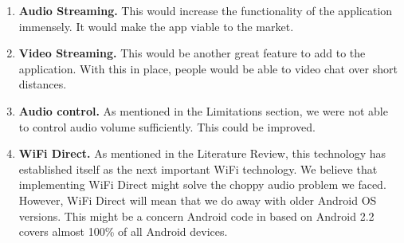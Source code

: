 \documentclass[12pt,svgnames,smaller]{article} %
\begin{document}
	\begin{enumerate}
		\item \textbf{Audio Streaming.} This would increase the functionality of the application immensely. It would make the app viable to the market.
		\item \textbf{Video Streaming.} This would be another great feature to add to the application. With this in place, people would be able to video chat over short distances.
		\item  \textbf{Audio control.} As mentioned in the Limitations section, we were not able to control audio volume sufficiently. This could be improved.
		\item \textbf{WiFi Direct.} As mentioned in the Literature Review, this technology has established itself as the next important WiFi technology. We believe that implementing WiFi Direct might solve the choppy audio problem we faced. However, WiFi Direct will mean that we do away with older Android OS versions. This might be a concern Android code in based on Android 2.2 covers almost 100\% of all Android devices. 
	\end{enumerate}

			
\end{document}
